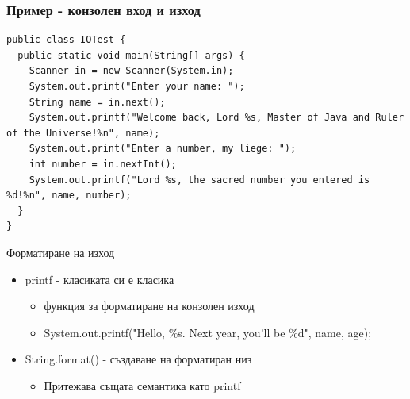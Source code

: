 \documentclass{beamer}
\begin{document}
\begin{frame}[fragile]
  \frametitle{Пример - конзолен вход и изход}
  \transdissolve
\begin{lstlisting}
public class IOTest {
  public static void main(String[] args) {
    Scanner in = new Scanner(System.in);
    System.out.print("Enter your name: ");
    String name = in.next();
    System.out.printf("Welcome back, Lord %s, Master of Java and Ruler of the Universe!%n", name);
    System.out.print("Enter a number, my liege: ");
    int number = in.nextInt();
    System.out.printf("Lord %s, the sacred number you entered is %d!%n", name, number);
  }
}  
\end{lstlisting}
\end{frame}

\begin{frame}{Форматиране на изход}
  \transdissolve
  \begin{itemize}
  \item printf - класиката си е класика \pause
    \begin{itemize}
      \item функция за форматиране на конзолен изход \pause
      \item System.out.printf("Hello, \%s. Next year, you'll be \%d",
        name, age); \pause
    \end{itemize}
  \item String.format() - създаване на форматиран низ \pause
    \begin{itemize}
      \item Притежава същата семантика като printf
    \end{itemize}
  \end{itemize}
\end{frame}
\end{document}

